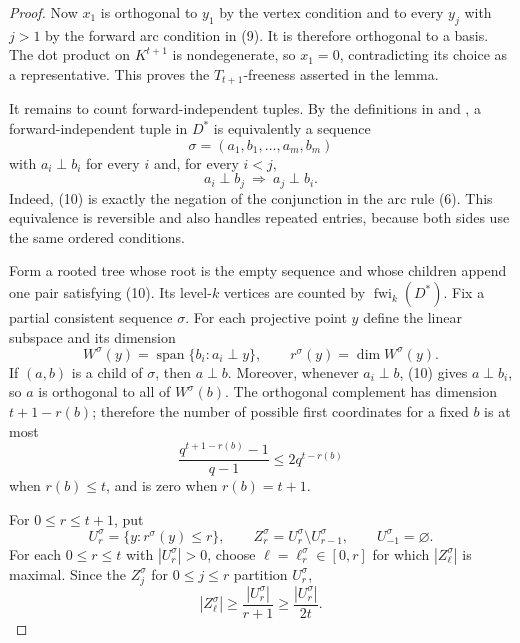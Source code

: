 \begin{proof}
Now $x_1$ is orthogonal to $y_1$ by the vertex condition and to every
$y_j$ with $j>1$ by the forward arc condition in (9).  It is therefore
orthogonal to a basis.  The dot product on $K^{t+1}$ is nondegenerate, so
$x_1=0$, contradicting its choice as a representative.  This proves the
$T_{t+1}$-freeness asserted in the lemma.

It remains to count forward-independent tuples.  By the definitions in
 and
, a forward-independent tuple in $D^*$ is
equivalently a sequence
\[
 \sigma=(a_1,b_1,\ldots,a_m,b_m)
\]
with $a_i\perp b_i$ for every $i$ and, for every $i<j$,
\[
 a_i\perp b_j\ \Longrightarrow\ a_j\perp b_i.               \tag{10}
\]
Indeed, (10) is exactly the negation of the conjunction in the arc rule
(6).  This equivalence is reversible and also handles repeated entries,
because both sides use the same ordered conditions.

Form a rooted tree whose root is the empty sequence and whose children
append one pair satisfying (10).  Its level-$k$ vertices are counted by
$\operatorname{fwi}_k(D^*)$.  Fix a partial consistent sequence $\sigma$.
For each projective point $y$ define the linear subspace and its dimension
\[
 W^\sigma(y)=\mathop{\mathrm{span}}\{b_i:a_i\perp y\},\qquad
 r^\sigma(y)=\dim W^\sigma(y).                                \tag{11}
\]
If $(a,b)$ is a child of $\sigma$, then $a\perp b$.  Moreover, whenever
$a_i\perp b$, (10) gives $a\perp b_i$, so $a$ is orthogonal to all of
$W^\sigma(b)$.  The orthogonal complement has dimension $t+1-r(b)$;
therefore the number of possible first coordinates for a fixed $b$ is at
most
\[
 \frac{q^{t+1-r(b)}-1}{q-1}\leq2q^{t-r(b)}                 \tag{12}
\]
when $r(b)\leq t$, and is zero when $r(b)=t+1$.

For $0\leq r\leq t+1$, put
\[
 U_r^\sigma=\{y:r^\sigma(y)\leq r\},\qquad
 Z_r^\sigma=U_r^\sigma\setminus U_{r-1}^\sigma,\qquad
 U_{-1}^\sigma=\varnothing.                                  \tag{13}
\]
For each $0\leq r\leq t$ with $|U_r^\sigma|>0$, choose
$\ell=\ell_r^\sigma\in[0,r]$ for which $|Z_\ell^\sigma|$ is maximal.
Since the $Z_j^\sigma$ for $0\leq j\leq r$ partition $U_r^\sigma$,
\[
 |Z_\ell^\sigma|\geq\frac{|U_r^\sigma|}{r+1}
 \geq\frac{|U_r^\sigma|}{2t}.                                 \tag{14}
\]


\end{proof}
